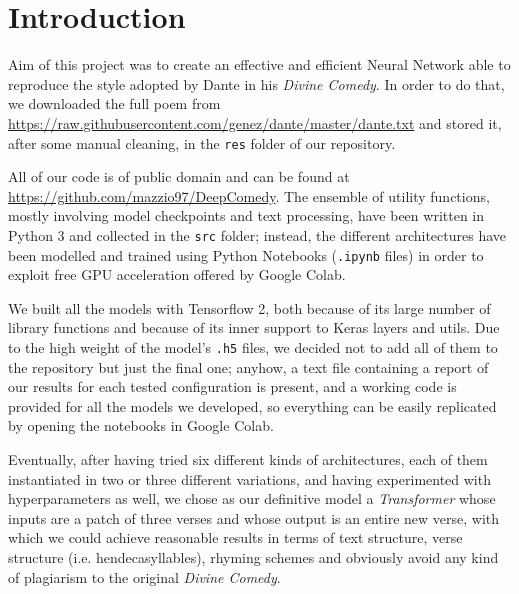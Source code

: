 \chapter{Introduction}

Aim of this project was to create an effective and efficient Neural Network able to reproduce the style adopted by Dante in his \textit{Divine Comedy}.
In order to do that, we downloaded the full poem from \url{https://raw.githubusercontent.com/genez/dante/master/dante.txt} and stored it, after some manual cleaning, in the \texttt{res} folder of our repository.

All of our code is of public domain and can be found at \url{https://github.com/mazzio97/DeepComedy}. 
The ensemble of utility functions, mostly involving model checkpoints and text processing, have been written in Python 3 and collected in the \texttt{src} folder; instead, the different architectures have been modelled and trained using Python Notebooks (\texttt{.ipynb} files) in order to exploit free GPU acceleration offered by Google Colab.

We built all the models with Tensorflow 2, both because of its large number of library functions and because of its inner support to Keras layers and utils.
Due to the high weight of the model's \texttt{.h5} files, we decided not to add all of them to the repository but just the final one;
anyhow, a text file containing a report of our results for each tested configuration is present, and a working code is provided for all the models we developed, so everything can be easily replicated by opening the notebooks in Google Colab.

Eventually, after having tried six different kinds of architectures, each of them instantiated in two or three different variations, and having experimented with hyperparameters as well, we chose as our definitive model a \textit{Transformer} whose inputs are a patch of three verses and whose output is an entire new verse, with which we could achieve reasonable results in terms of text structure, verse structure (i.e. hendecasyllables), rhyming schemes and obviously avoid any kind of plagiarism to the original \textit{Divine Comedy}.